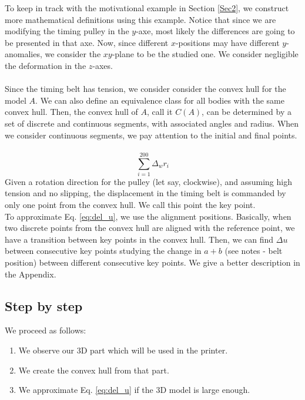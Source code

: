 \documentclass[conference]{IEEEtran}
\begin{document}
To keep in track with the motivational example in Section \ref{Sec2}, we construct more mathematical definitions using this example. Notice that since we are modifying the timing pulley in the $y$-axe, most likely the differences are going to be presented in that axe. Now, since different $x$-positions may have different $y$-anomalies, we consider the $xy$-plane to be the studied one. We consider negligible the deformation in the $z$-axes.\\
\quad\\
Since the timing belt has tension, we consider consider the convex hull for the model $A$. We can also define an equivalence class for all bodies with the same convex hull. Then, the convex hull of $A$, call it $C(A)$, can be determined by a set of discrete and continuous segments, with associated angles and radius. When we consider continuous segments, we pay attention to the initial and final points.\\
\quad\\
\begin{equation}
\sum_{i=1}^{200}\Delta_wr_i
\label{eq:del_u}
\end{equation}
Given a rotation direction for the pulley (let say, clockwise), and assuming high tension and no slipping, the displacement in the timing belt is commanded by only one point from the convex hull. We call this point the key point.\\
To approximate Eq. \ref{eq:del_u}, we use the alignment positions. Basically, when two discrete points from the convex hull are aligned with the reference point, we have a transition between key points in the convex hull. Then, we can find $\Delta u$ between consecutive key points studying the change in $a+b$ (see notes - belt position) between different consecutive key points. We give a better description in the Appendix.

\subsection{Step by step}

We proceed as follows:
\begin{enumerate}

\item We observe our 3D part which will be used in the printer.
\item We create the convex hull from that part.
\item We approximate Eq. \ref{eq:del_u} if the 3D model is large enough.

\end{enumerate}
\end{document}
